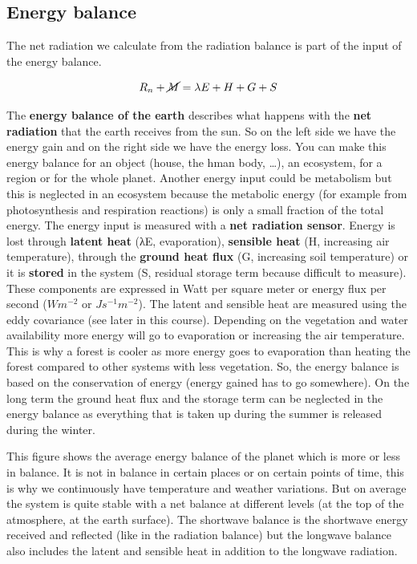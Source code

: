 \documentclass[oneside]{book}
\begin{document}
\subsection{Energy balance}\label{energy-balance-1}

The net radiation we calculate from the radiation balance is part of the
input of the energy balance.

\begin{equation} 
  R_n + \cancel{M} = \lambda E + H + G + S
  \label{eq:EqEnergyBalance}
\end{equation}

The \textbf{energy balance of the earth} describes what happens with the
\textbf{net radiation} that the earth receives from the sun. So on the
left side we have the energy gain and on the right side we have the
energy loss. You can make this energy balance for an object (house, the
hman body, \ldots{}), an ecosystem, for a region or for the whole
planet. Another energy input could be metabolism but this is neglected
in an ecosystem because the metabolic energy (for example from
photosynthesis and respiration reactions) is only a small fraction of
the total energy. The energy input is measured with a \textbf{net
radiation sensor}. Energy is lost through \textbf{latent heat} (λE,
evaporation), \textbf{sensible heat} (H, increasing air temperature),
through the \textbf{ground heat flux} (G, increasing soil temperature)
or it is \textbf{stored} in the system (S, residual storage term because
difficult to measure). These components are expressed in Watt per square
meter or energy flux per second (\(W m^{-2}\) or \(J s^{-1} m^{-2}\)).
The latent and sensible heat are measured using the eddy covariance (see
later in this course). Depending on the vegetation and water
availability more energy will go to evaporation or increasing the air
temperature. This is why a forest is cooler as more energy goes to
evaporation than heating the forest compared to other systems with less
vegetation. So, the energy balance is based on the conservation of
energy (energy gained has to go somewhere). On the long term the ground
heat flux and the storage term can be neglected in the energy balance as
everything that is taken up during the summer is released during the
winter.

This figure shows the average energy balance of the planet which is more
or less in balance. It is not in balance in certain places or on certain
points of time, this is why we continuously have temperature and weather
variations. But on average the system is quite stable with a net balance
at different levels (at the top of the atmosphere, at the earth
surface). The shortwave balance is the shortwave energy received and
reflected (like in the radiation balance) but the longwave balance also
includes the latent and sensible heat in addition to the longwave
radiation.
\end{document}
